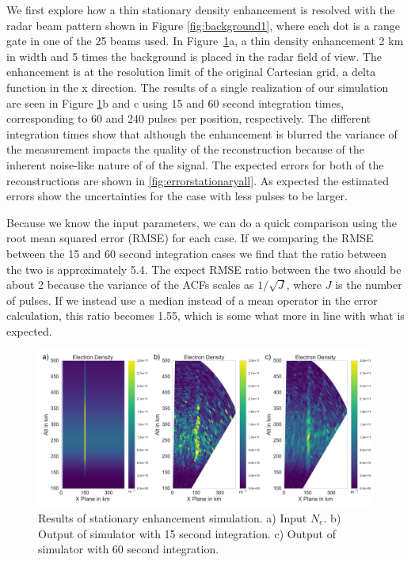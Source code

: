 \documentclass[draft,ras]{agutex}
\begin{document}
\begin{article}
We first explore how a thin stationary density enhancement is resolved with the radar beam pattern shown in Figure \ref{fig:background1}, where each dot is a range gate in one of the 25 beams used. In Figure~\ref{fig:stationaryall}a, a thin density enhancement 2 km in width and 5 times the background is placed in the radar field of view. The enhancement is at the resolution limit of the original Cartesian grid, a delta function in the x direction.  The results of a single realization of our simulation 
are seen in Figure \ref{fig:stationaryall}b and c using 15 and 60 second integration times, corresponding to 60 and 240 pulses per position, respectively. The different integration times show that although the enhancement is blurred the variance of the measurement impacts the quality of the reconstruction because of the inherent noise-like nature of of the signal. The expected errors for both of the reconstructions are shown in \ref{fig:errorstationaryall}. As expected the estimated errors show the uncertainties for the case with less pulses to be larger. 

Because we know the input parameters, we can do a quick comparison using the root mean squared error (RMSE) for each case. If we comparing the RMSE between the 15 and 60 second integration cases we find that the ratio between the two is approximately 5.4. The expect RMSE ratio between the two should be about 2 because the variance of the ACFs scales as $1/\sqrt{J}$, where $J$ is the number of pulses. If we instead use a median instead of a mean operator in the error calculation, this ratio becomes 1.55, which is some what more in line with what is expected.

\begin{figure}[!t]
\centering
\includegraphics[width=6in]{stationary}
\caption{Results of stationary enhancement simulation. a) Input $N_e$. b) Output of simulator with 15 second integration. c) Output of simulator with 60 second integration.}
\label{fig:stationaryall}
\end{figure}


\end{article}
\end{document}

